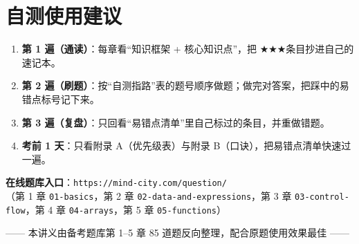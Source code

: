 \documentclass[UTF8,zihao=-4,a4paper]{ctexart}
\newcommand{\cstar}{\textcolor{deepred}{$\bigstar$}}
\begin{document}
\section{自测使用建议}

\begin{tipbox}
\begin{enumerate}
  \item \textbf{第 1 遍（通读）}：每章看“知识框架 + 核心知识点”，把 \cstar\cstar\cstar 条目抄进自己的速记本。
  \item \textbf{第 2 遍（刷题）}：按“自测指路”表的题号顺序做题；做完对答案，把踩中的易错点标号记下来。
  \item \textbf{第 3 遍（复盘）}：只回看“易错点清单”里自己标过的条目，并重做错题。
  \item \textbf{考前 1 天}：只看附录 A（优先级表）与附录 B（口诀），把易错点清单快速过一遍。
\end{enumerate}
\end{tipbox}

\vspace{6pt}
\noindent\textbf{在线题库入口}：\texttt{https://mind-city.com/question/}\\
（第 1 章 \texttt{01-basics}，第 2 章 \texttt{02-data-and-expressions}，第 3 章 \texttt{03-control-flow}，第 4 章 \texttt{04-arrays}，第 5 章 \texttt{05-functions}）

\vspace{10pt}
\begin{center}
\small\color{gray}
—— 本讲义由备考题库第 1–5 章 85 道题反向整理，配合原题使用效果最佳 ——
\end{center}
\end{document}
